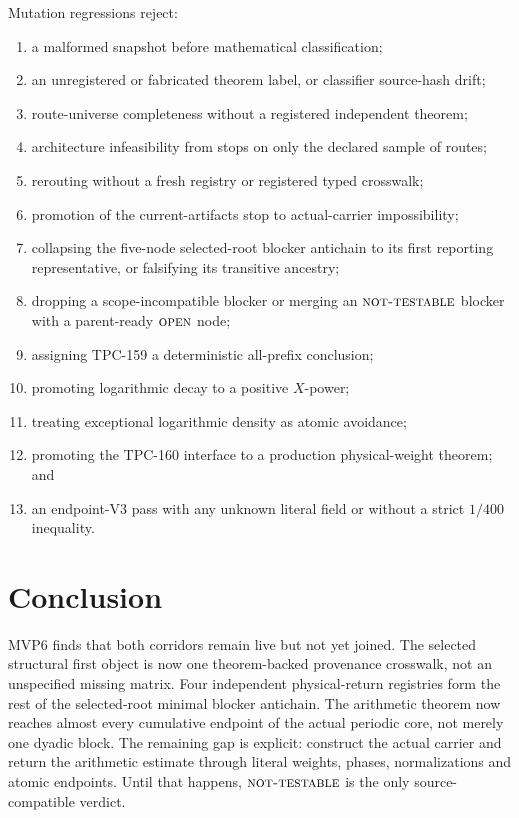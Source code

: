 \documentclass[11pt]{article}
\theoremstyle{definition}
\theoremstyle{remark}
\newcommand{\NT}{\textnormal{\textsc{not-testable}}}
\newcommand{\OPEN}{\textnormal{\textsc{open}}}
\begin{document}
Mutation regressions reject:
\begin{enumerate}[leftmargin=2em]
\item a malformed snapshot before mathematical classification;
\item an unregistered or fabricated theorem label, or classifier
  source-hash drift;
\item route-universe completeness without a registered independent
  theorem;
\item architecture infeasibility from stops on only the declared
  sample of routes;
\item rerouting without a fresh registry or registered typed
  crosswalk;
\item promotion of the current-artifacts stop to actual-carrier
  impossibility;
\item collapsing the five-node selected-root blocker antichain to its
  first reporting representative, or falsifying its transitive
  ancestry;
\item dropping a scope-incompatible blocker or merging an \(\NT\)
  blocker with a parent-ready \(\OPEN\) node;
\item assigning TPC-159 a deterministic all-prefix conclusion;
\item promoting logarithmic decay to a positive \(X\)-power;
\item treating exceptional logarithmic density as atomic avoidance;
\item promoting the TPC-160 interface to a production physical-weight
  theorem; and
\item an endpoint-V3 pass with any unknown literal field or without a
  strict \(1/400\) inequality.
\end{enumerate}

\section{Conclusion}

MVP6 finds that both corridors remain live but not yet joined.  The
selected structural first object is now one theorem-backed provenance
crosswalk, not an unspecified missing matrix.  Four independent
physical-return registries form the rest of the selected-root minimal
blocker antichain.  The arithmetic theorem now reaches almost every
cumulative endpoint of the actual periodic core, not merely one
dyadic block.  The remaining gap is explicit: construct the actual
carrier and return the arithmetic estimate through literal weights,
phases, normalizations and atomic endpoints.  Until that happens,
\(\NT\) is the only source-compatible verdict.



\end{document}
